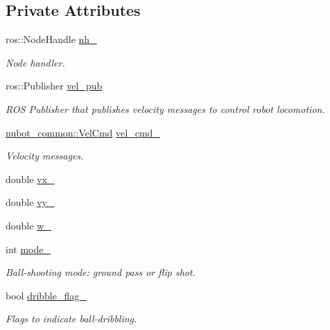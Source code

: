 \subsection*{Private Attributes}
\begin{DoxyCompactItemize}
\item 
ros\-::\-Node\-Handle \hyperlink{classnubot_1_1NubotTeleopKey_aa0685c9872576f6ce3b19b6f467e5cee}{nh\-\_\-}
\begin{DoxyCompactList}\small\item\em Node handler. \end{DoxyCompactList}\item 
ros\-::\-Publisher \hyperlink{classnubot_1_1NubotTeleopKey_af2b940ed562da027c7eda729403e4f86}{vel\-\_\-pub}
\begin{DoxyCompactList}\small\item\em R\-O\-S Publisher that publishes velocity messages to control robot locomotion. \end{DoxyCompactList}\item 
\hyperlink{namespacenubot__common_acc00f78d81bb67c28f6b4aaf38c2c884}{nubot\-\_\-common\-::\-Vel\-Cmd} \hyperlink{classnubot_1_1NubotTeleopKey_a7c70e3f5f30f940e9c508deb84f23da5}{vel\-\_\-cmd\-\_\-}
\begin{DoxyCompactList}\small\item\em Velocity messages. \end{DoxyCompactList}\item 
double \hyperlink{classnubot_1_1NubotTeleopKey_aafe296ec15a99f249180144842c64b29}{vx\-\_\-}
\item 
double \hyperlink{classnubot_1_1NubotTeleopKey_a9bd6bb13fc993a07fb3d2272d3e2a600}{vy\-\_\-}
\item 
double \hyperlink{classnubot_1_1NubotTeleopKey_a40143b187fb9f6278b0c2847acd3d756}{w\-\_\-}
\item 
int \hyperlink{classnubot_1_1NubotTeleopKey_a5d4f917773136b83f6ba268f50c8a0ea}{mode\-\_\-}
\begin{DoxyCompactList}\small\item\em Ball-\/shooting mode\-: ground pass or flip shot. \end{DoxyCompactList}\item 
bool \hyperlink{classnubot_1_1NubotTeleopKey_a91a6e9ae14ee91dfa3880ab840d03ca1}{dribble\-\_\-flag\-\_\-}
\begin{DoxyCompactList}\small\item\em Flags to indicate ball-\/dribbling. \end{DoxyCompactList}\item 

\end{DoxyCompactItemize}
